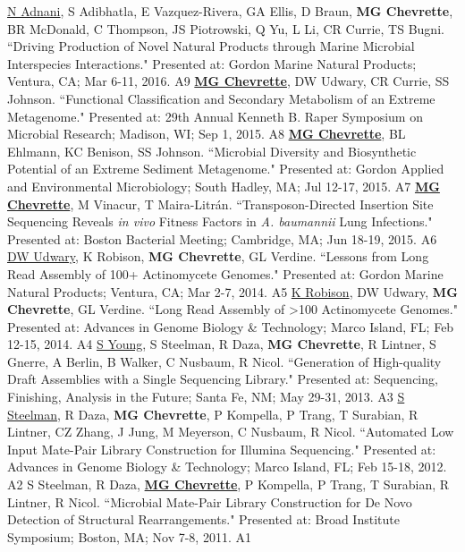 \begin{cvpubs}
  \cvpub
    {\underline{N Adnani}, S Adibhatla, E Vazquez-Rivera, GA Ellis, D Braun, \textbf{MG Chevrette}, BR McDonald, C Thompson, JS Piotrowski, Q Yu, L Li, CR Currie, TS Bugni. ``Driving Production of Novel Natural Products through Marine Microbial Interspecies Interactions." Presented at: Gordon Marine Natural Products; Ventura, CA; Mar 6-11, 2016.} %
    {A9} %
  \cvpub
    {\textbf{\underline{MG Chevrette}}, DW Udwary, CR Currie, SS Johnson. ``Functional Classification and Secondary Metabolism of an Extreme Metagenome." Presented at: 29th Annual Kenneth B. Raper Symposium on Microbial Research; Madison, WI; Sep 1, 2015.} %
    {A8} %
  \cvpub
    {\textbf{\underline{MG Chevrette}}, BL Ehlmann, KC Benison, SS Johnson. ``Microbial Diversity and Biosynthetic Potential of an Extreme Sediment Metagenome." Presented at: Gordon Applied and Environmental Microbiology; South Hadley, MA; Jul 12-17, 2015.} %
    {A7} %
  \cvpub
    {\textbf{\underline{MG Chevrette}}, M Vinacur, T Maira-Litr\'{a}n. ``Transposon-Directed Insertion Site Sequencing Reveals \textit{in vivo} Fitness Factors in \textit{A. baumannii} Lung Infections." Presented at: Boston Bacterial Meeting; Cambridge, MA; Jun 18-19, 2015.} %
    {A6} %
  \cvpub
    {\underline{DW Udwary}, K Robison, \textbf{MG Chevrette}, GL Verdine. ``Lessons from Long Read Assembly of 100+ Actinomycete Genomes." Presented at: Gordon Marine Natural Products; Ventura, CA; Mar 2-7, 2014.} %
    {A5} %
  \cvpub
    {\underline{K Robison}, DW Udwary, \textbf{MG Chevrette}, GL Verdine. ``Long Read Assembly of >100 Actinomycete Genomes." Presented at: Advances in Genome Biology \& Technology; Marco Island, FL; Feb 12-15, 2014.} %
    {A4} %
  \cvpub
    {\underline{S Young}, S Steelman, R Daza, \textbf{MG Chevrette}, R Lintner, S Gnerre, A Berlin, B Walker, C Nusbaum, R Nicol. ``Generation of High-quality Draft Assemblies with a Single Sequencing Library." Presented at: Sequencing, Finishing, Analysis in the Future; Santa Fe, NM; May 29-31, 2013.} %
    {A3} %
  \cvpub
    {\underline{S Steelman}, R Daza, \textbf{MG Chevrette}, P Kompella, P Trang, T Surabian, R Lintner, CZ Zhang, J Jung, M Meyerson, C Nusbaum, R Nicol. ``Automated Low Input Mate-Pair Library Construction for Illumina Sequencing." Presented at: Advances in Genome Biology \& Technology; Marco Island, FL; Feb 15-18, 2012.} %
    {A2} %
  \cvpub
    {S Steelman, R Daza, \underline{\textbf{MG Chevrette}}, P Kompella, P Trang, T Surabian, R Lintner, R Nicol. ``Microbial Mate-Pair Library Construction for De Novo Detection of Structural Rearrangements." Presented at: Broad Institute Symposium; Boston, MA; Nov 7-8, 2011.} %
    {A1} %
\end{cvpubs}